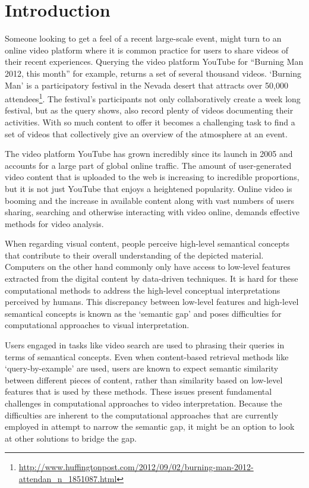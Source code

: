 \chapter{Introduction}
\label{ch:introduction}

Someone looking to get a feel of a recent large-scale event, might turn to an online video platform where it is common practice for users to share videos of their recent experiences\cite{Cha:2007ty,Cheng:2007tc}. Querying the video platform YouTube for ``Burning Man 2012, this month'' for example, returns a set of several thousand videos\cite{youtubeBM}. `Burning Man' is a participatory festival in the Nevada desert that attracts over 50,000 attendees\footnote{\url{http://www.huffingtonpost.com/2012/09/02/burning-man-2012-attendan_n_1851087.html}}. The festival's participants not only collaboratively create  a week long festival, but as the query shows, also record plenty of videos documenting their activities. With so much content to offer it becomes a challenging task to find a set of videos that collectively give an overview of the atmosphere at an event.

The video platform YouTube has grown incredibly since its launch in 2005 and accounts for a large part of global online traffic\cite{Cheng:2007tc}. The amount of user-generated video content that is uploaded to the web is increasing to incredible proportions, but it is not just YouTube that enjoys a heightened popularity. Online video is booming and the increase in available content along with vast numbers of users sharing, searching and otherwise interacting with video online, demands effective methods for video analysis.

When regarding visual content, people perceive high-level semantical concepts that contribute to their overall understanding of the depicted material. Computers on the other hand commonly only have access to low-level features extracted from the digital content by data-driven techniques. It is hard for these computational methods to address the high-level conceptual interpretations perceived by humans. This discrepancy between low-level features and high-level semantical concepts is known as the `semantic gap'\cite{Smeulders:2000tx} and poses difficulties for computational approaches to visual interpretation.

Users engaged in tasks like video search are used to phrasing their queries in terms of semantical concepts. Even when content-based retrieval methods like `query-by-example' are used, users are known to expect semantic similarity between different pieces of content, rather than similarity based on low-level features that is used by these methods\cite{Worring:2007vm, Snoek:jf, Hollink:2005ei}. These issues present fundamental challenges in computational approaches to video interpretation. Because the difficulties are inherent to the computational approaches that are currently employed in attempt to narrow the semantic gap, it might be an option to look at other solutions to bridge the gap.

